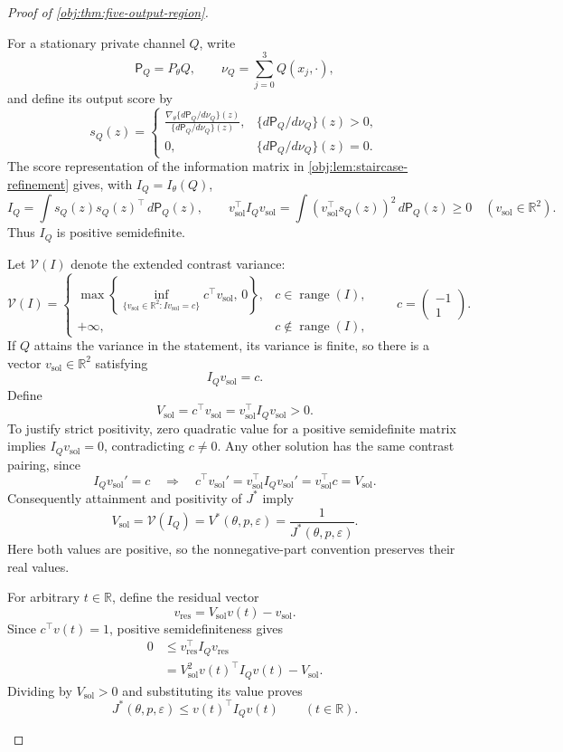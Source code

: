 \documentclass[11pt]{article}
\begin{document}
\begin{proof}[Proof of \cref{obj:thm:five-output-region}]
\begin{enumerate}
For a stationary private channel \(Q\), write
\[
\mathsf P_Q=P_\theta Q,\qquad
\nu_Q=\sum_{j=0}^3Q(x_j,\cdot),
\]
and define its output score by
\[
s_Q(z)=
\begin{cases}
\displaystyle
\frac{\nabla_\theta\{d\mathsf P_Q/d\nu_Q\}(z)}
     {\{d\mathsf P_Q/d\nu_Q\}(z)},
&\{d\mathsf P_Q/d\nu_Q\}(z)>0,\\[6pt]
0,&\{d\mathsf P_Q/d\nu_Q\}(z)=0.
\end{cases}
\]
The score representation of the information matrix in
\cref{obj:lem:staircase-refinement} gives, with
\(I_Q=I_\theta(Q)\),
\[
I_Q=\int s_Q(z)s_Q(z)^\top\,d\mathsf P_Q(z),
\qquad
v_{\mathrm{sol}}^\top I_Qv_{\mathrm{sol}}
=
\int(v_{\mathrm{sol}}^\top s_Q(z))^2\,d\mathsf P_Q(z)\ge0
\quad(v_{\mathrm{sol}}\in\mathbb R^2).
\]
Thus \(I_Q\) is positive semidefinite.

Let \(\mathcal V(I)\) denote the extended contrast variance:
\[
\mathcal V(I)=
\begin{cases}
\displaystyle
\max\!\left\{\inf_{\{v_{\mathrm{sol}}\in\mathbb R^2:
                         Iv_{\mathrm{sol}}=c\}}
                  c^\top v_{\mathrm{sol}},\,0\right\},
&c\in\operatorname{range}(I),\\
+\infty,&c\notin\operatorname{range}(I),
\end{cases}
\qquad
c=\begin{pmatrix}-1\\1\end{pmatrix}.
\]
If \(Q\) attains the variance in the statement, its variance is finite,
so there is a vector \(v_{\mathrm{sol}}\in\mathbb R^2\) satisfying
\[
I_Qv_{\mathrm{sol}}=c.
\]
Define
\[
V_{\mathrm{sol}}=c^\top v_{\mathrm{sol}}
=v_{\mathrm{sol}}^\top I_Qv_{\mathrm{sol}}>0.
\]
To justify strict positivity, zero quadratic value for a positive
semidefinite matrix implies \(I_Qv_{\mathrm{sol}}=0\), contradicting
\(c\ne0\). Any other solution has the same contrast pairing, since
\[
I_Qv_{\mathrm{sol}}'=c
\quad\Longrightarrow\quad
c^\top v_{\mathrm{sol}}'
=
v_{\mathrm{sol}}^\top I_Qv_{\mathrm{sol}}'
=
v_{\mathrm{sol}}^\top c
=
V_{\mathrm{sol}}.
\]
Consequently attainment and positivity of \(J^*\) imply
\[
V_{\mathrm{sol}}=\mathcal V(I_Q)
=V^*(\theta,p,\varepsilon)
=\frac1{J^*(\theta,p,\varepsilon)}.
\]
Here both values are positive, so the nonnegative-part convention
preserves their real values.

For arbitrary \(t\in\mathbb R\), define the residual vector
\[
v_{\mathrm{res}}=V_{\mathrm{sol}}v(t)-v_{\mathrm{sol}}.
\]
Since \(c^\top v(t)=1\), positive semidefiniteness gives
\[
\begin{aligned}
0
&\le v_{\mathrm{res}}^\top I_Qv_{\mathrm{res}}\\
&=V_{\mathrm{sol}}^2v(t)^\top I_Qv(t)-V_{\mathrm{sol}}.
\end{aligned}
\]
Dividing by \(V_{\mathrm{sol}}>0\) and substituting its value proves
\[
J^*(\theta,p,\varepsilon)\le v(t)^\top I_Qv(t)
\qquad(t\in\mathbb R).
\]


\end{enumerate}
\end{proof}
\end{document}
